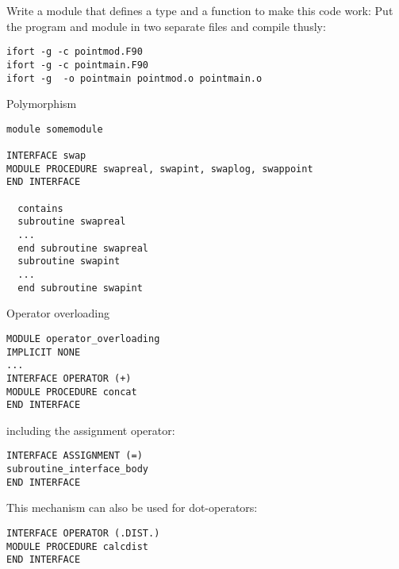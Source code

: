 \begin{exercise}
  \label{ex:fpointmod}
  Write a module  that defines a type  and a
  function  to make this code work:
  Put the program and module in two separate files and compile thusly:
\begin{verbatim}
ifort -g -c pointmod.F90
ifort -g -c pointmain.F90
ifort -g  -o pointmain pointmod.o pointmain.o 
\end{verbatim}
\end{exercise}

 {Polymorphism}

\begin{verbatim}
module somemodule

INTERFACE swap
MODULE PROCEDURE swapreal, swapint, swaplog, swappoint
END INTERFACE

  contains
  subroutine swapreal
  ...
  end subroutine swapreal
  subroutine swapint
  ...
  end subroutine swapint
\end{verbatim}

 {Operator overloading}

\begin{verbatim}
MODULE operator_overloading
IMPLICIT NONE
...
INTERFACE OPERATOR (+)
MODULE PROCEDURE concat
END INTERFACE
\end{verbatim}

including the assignment operator:

\begin{verbatim}
INTERFACE ASSIGNMENT (=) 
subroutine_interface_body
END INTERFACE
\end{verbatim}

This mechanism can also be used for dot-operators:

\begin{verbatim}
INTERFACE OPERATOR (.DIST.)
MODULE PROCEDURE calcdist
END INTERFACE
\end{verbatim}

